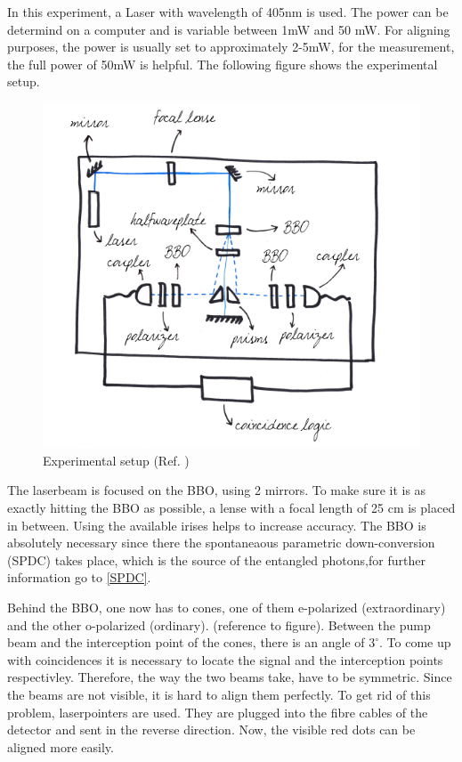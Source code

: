 \documentclass[12pt,a4paper]{article}
\begin{document}
\begin{multicols}{2}
In this experiment, a Laser with wavelength of 405nm is used. The power can be determind on a computer and is variable between 1mW and 50 mW. For aligning purposes, the power is usually set to approximately 2-5mW, for the measurement, the full power of 50mW is helpful.  The following figure shows the experimental setup.
\begin{figure}[H]
 \centering
 \includegraphics[scale=0.7]{./figures/Aufbau_Marion.png}
 \caption{Experimental setup (Ref. \cite{protmarion})}
 \label{fig:setup}
\end{figure}
The laserbeam is  focused on the BBO, using 2 mirrors. To make sure it is as exactly hitting the BBO as possible, a lense with a focal length of 25 cm is placed in between. Using the available irises helps to increase accuracy. The BBO is absolutely necessary since there the spontaneaous parametric down-conversion (SPDC) takes place, which is the source of the entangled photons,for further information go to \ref{SPDC}. 

 Behind the BBO, one now has to cones, one of them e-polarized (extraordinary) and the other o-polarized (ordinary). (reference to figure). Between the pump beam and the interception point of the cones, there is an angle of $3^\circ$. To come up with coincidences it is  necessary to locate the signal and the interception points respectivley. Therefore, the way the two beams take, have to be symmetric. Since the beams are not visible, it is hard to align them perfectly. To get rid of this problem, laserpointers are used. They are plugged into the fibre cables of the detector and sent in the reverse direction. Now, the visible red dots can be aligned more easily.
 

\end{multicols}
\end{document}
